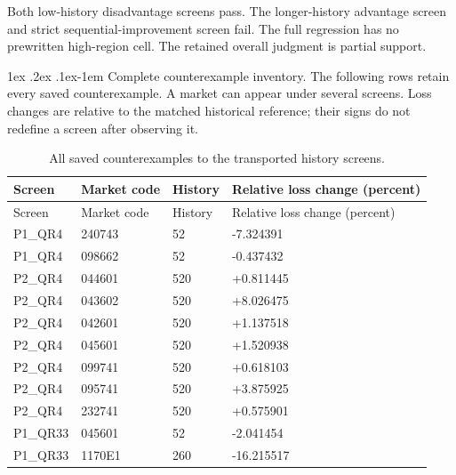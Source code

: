 \documentclass[10pt,a4paper]{article}
\makeatletter
\renewcommand\paragraph{\@startsection{paragraph}{4}{\z@}%
  {1ex \@plus .2ex \@minus .1ex}{-1em}%
  {\normalfont\normalsize\bfseries}}
\makeatother
\begin{document}
Both low-history disadvantage screens pass. The longer-history advantage screen and strict sequential-improvement screen fail. The full regression has no prewritten high-region cell. The retained overall judgment is partial support.

\paragraph{Complete counterexample inventory.} The following rows retain every saved counterexample. A market can appear under several screens. Loss changes are relative to the matched historical reference; their signs do not redefine a screen after observing it.

\begin{longtable}{lllp{7.5cm}}

\caption{All saved counterexamples to the transported history screens.}\label{tab:submission-wp2-counterexamples}\\

\toprule Screen & Market code & History & Relative loss change (percent)\\\midrule\endfirsthead

\toprule Screen & Market code & History & Relative loss change (percent)\\\midrule\endhead

P1\_QR4 & 240743 & 52 & -7.324391\\

P1\_QR4 & 098662 & 52 & -0.437432\\

P2\_QR4 & 044601 & 520 & +0.811445\\

P2\_QR4 & 043602 & 520 & +8.026475\\

P2\_QR4 & 042601 & 520 & +1.137518\\

P2\_QR4 & 045601 & 520 & +1.520938\\

P2\_QR4 & 099741 & 520 & +0.618103\\

P2\_QR4 & 095741 & 520 & +3.875925\\

P2\_QR4 & 232741 & 520 & +0.575901\\

P1\_QR33 & 045601 & 52 & -2.041454\\

P1\_QR33 & 1170E1 & 260 & -16.215517\\


\end{longtable}
\end{document}
